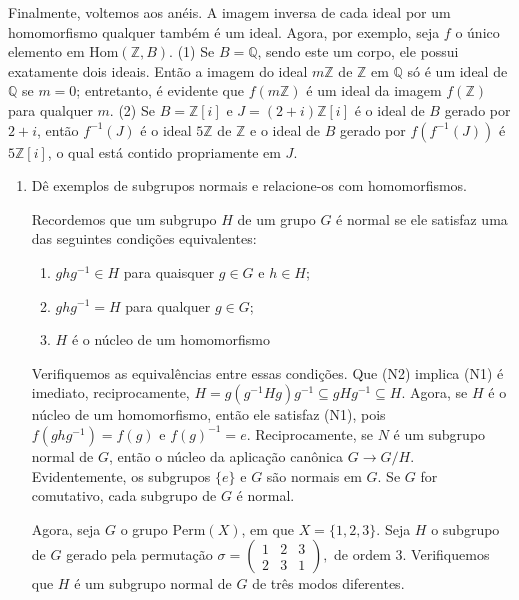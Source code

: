 Finalmente, voltemos aos anéis. A imagem inversa de cada ideal por um homomorfismo qualquer também é um ideal. Agora, 
por exemplo, seja $f$ o único elemento em $\mathrm{Hom}(\mathbb{Z}, B)$. (1) Se $B = \mathbb{Q}$, sendo este um corpo, 
ele possui exatamente dois ideais. Então a imagem do ideal $m\mathbb{Z}$ de $\mathbb{Z}$ em $\mathbb{Q}$ só é um ideal 
de $\mathbb{Q}$ se $m = 0$; entretanto, é evidente que $f(m\mathbb{Z})$ é um ideal da imagem $f(\mathbb{Z})$ para qualquer $m$.
(2) Se $B = \mathbb{Z}[i]$ e $J = (2+i)\mathbb{Z}[i]$ é o ideal de $B$ gerado por $2+i$, então $f^{-1}(J)$ é o ideal 
$5\mathbb{Z}$ de $\mathbb{Z}$ e o ideal de $B$ gerado por $f(f^{-1}(J))$ é $5\mathbb{Z}[i]$, o qual está contido propriamente em $J$.

\begin{exemplo}
\leavevmode
    \begin{enumerate}[left=0.5cm, align=left, nosep]
        \item Dê exemplos de subgrupos normais e relacione-os com homomorfismos.
        
        Recordemos que um subgrupo $H$ de um grupo $G$ é normal se ele satisfaz uma das seguintes condições equivalentes:
        \begin{enumerate}[label=(N\arabic*), left=0.5cm, align=left, nosep]
            \item $ghg^{-1} \in H$ para quaisquer $g \in G$ e $h \in H$;
            \item $ghg^{-1} = H$ para qualquer $g \in G$;
            \item $H$ é o núcleo de um homomorfismo
        \end{enumerate}

        Verifiquemos as equivalências entre essas condições. Que (N2) implica (N1) é imediato, reciprocamente,
        $H = g(g^{-1}Hg)g^{-1} \subseteq gHg^{-1} \subseteq H$. Agora, se $H$ é o núcleo de um homomorfismo, então ele 
        satisfaz (N1), pois $f(ghg^{-1}) = f(g)$ e $f(g)^{-1} = e$. Reciprocamente, se $N$ é um subgrupo normal de $G$, 
        então o núcleo da aplicação canônica $G \to G/H$. Evidentemente, os subgrupos $\{e\}$ e $G$ são normais em $G$.  
        Se $G$ for comutativo, cada subgrupo de $G$ é normal.

        Agora, seja $G$ o grupo $\mathrm{Perm}(X)$, em que $X = \{1,2,3\}$.
        Seja $H$ o subgrupo de $G$ gerado pela permutação
        $\sigma =
        \begin{pmatrix}
        1 & 2 & 3 \\
        2 & 3 & 1
        \end{pmatrix},
        $ de ordem $3$. Verifiquemos que $H$ é um subgrupo normal de $G$ de três modos diferentes.


\end{enumerate}
\end{exemplo}
